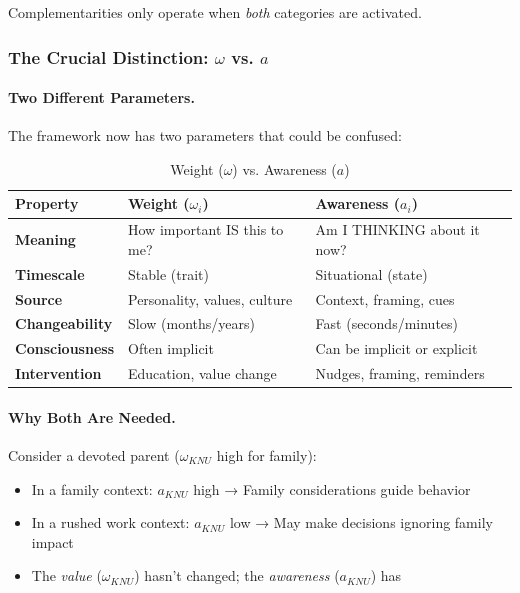 Complementarities only operate when \emph{both} categories are activated.

\subsubsection{The Crucial Distinction: $\omega$ vs. $a$}

\paragraph{Two Different Parameters.}
The framework now has two parameters that could be confused:

\begin{table}[htbp]
\centering
\caption{Weight ($\omega$) vs. Awareness ($a$)}
\label{tab:omega-vs-a}
\renewcommand{\arraystretch}{1.4}
\begin{tabular}{@{}lll@{}}
\toprule
\textbf{Property} & \textbf{Weight ($\omega_i$)} & \textbf{Awareness ($a_i$)} \\
\midrule
\textbf{Meaning} & How important IS this to me? & Am I THINKING about it now? \\
\textbf{Timescale} & Stable (trait) & Situational (state) \\
\textbf{Source} & Personality, values, culture & Context, framing, cues \\
\textbf{Changeability} & Slow (months/years) & Fast (seconds/minutes) \\
\textbf{Consciousness} & Often implicit & Can be implicit or explicit \\
\textbf{Intervention} & Education, value change & Nudges, framing, reminders \\
\bottomrule
\end{tabular}
\end{table}

\paragraph{Why Both Are Needed.}
Consider a devoted parent ($\omega_{KNU}$ high for family):

\begin{itemize}
\item In a family context: $a_{KNU}$ high → Family considerations guide behavior
\item In a rushed work context: $a_{KNU}$ low → May make decisions ignoring family impact
\item The \emph{value} ($\omega_{KNU}$) hasn't changed; the \emph{awareness} ($a_{KNU}$) has
\end{itemize}

